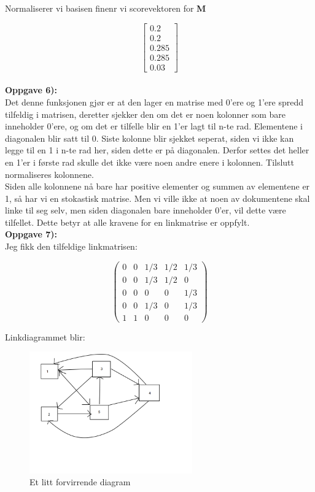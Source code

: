\documentclass[a4paper,norsk,11pt,twoside]{article}
\begin{document}
Normaliserer vi basisen finenr vi scorevektoren for \textbf{M}

$$
\begin{bmatrix}
0.2 \\ 0.2 \\ 0.285 \\ 0.285 \\ 0.03
\end{bmatrix}
$$\\

\textbf{Oppgave 6):}\\

Det denne funksjonen gjør er at den lager en matrise med 0'ere og 1'ere spredd tilfeldig i matrisen, deretter sjekker den om det er noen kolonner som bare inneholder 0'ere, og om det er tilfelle blir en 1'er lagt til n-te rad. Elementene i diagonalen blir satt til 0. Siste kolonne blir sjekket seperat, siden vi ikke kan legge til en 1 i n-te rad her, siden dette er på diagonalen. Derfor settes det heller en 1'er i første rad skulle det ikke være noen andre enere i kolonnen. Tilslutt normaliseres kolonnene. \\

Siden alle kolonnene nå bare har positive elementer og summen av elementene er 1, så har vi en stokastisk matrise. Men vi ville ikke at noen av dokumentene skal linke til seg selv, men siden diagonalen bare inneholder 0'er, vil dette være tilfellet. Dette betyr at alle kravene for en linkmatrise er oppfylt.\\


\textbf{Oppgave 7):}\\

Jeg fikk den tilfeldige linkmatrisen:

$$
\begin{pmatrix}
0 & 0 & 1/3 & 1/2 & 1/3 \\
0 & 0 & 1/3 & 1/2 & 0 \\
0 & 0 & 0 & 0 & 1/3 \\
0 & 0 & 1/3 & 0 & 1/3 \\
1 & 1 & 0 & 0 & 0
\end{pmatrix}
$$ 

Linkdiagrammet blir:

\begin{figure}[hbt]
\begin{center}
\includegraphics[width=70mm]{linkdiagram.png}
\caption{Et litt forvirrende diagram}\label{fig:finfigur}
\end{center}
\end{figure} 
\end{document}
